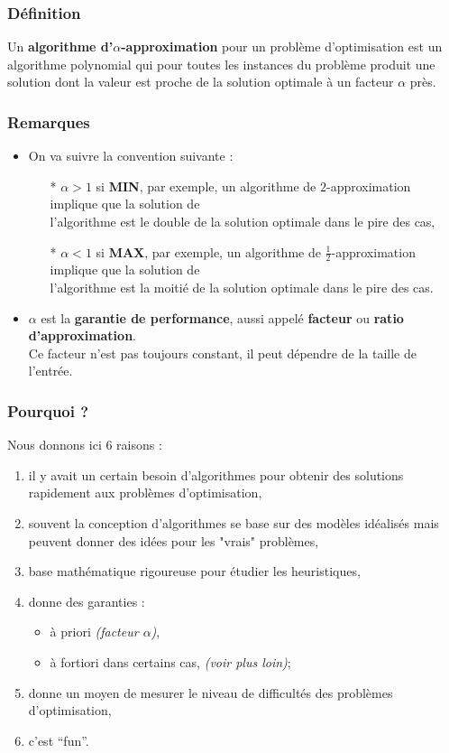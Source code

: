 \documentclass{article}
\begin{document}
\begin{sffamily}
\subsubsection*{Définition}
Un \textbf{algorithme d'$\alpha$-approximation} pour un problème d'optimisation est un algorithme polynomial qui \indent pour toutes les
instances du problème produit une solution dont la valeur est proche de la solution optimale \indent à un facteur $\alpha$ près.

\subsubsection*{Remarques}
\begin{itemize}
\item On va suivre la convention suivante :
\begin{itemize}
\item[*]$\boxed{\alpha > 1}$ si \textbf{MIN}, par exemple, un algorithme de $2$-approximation implique que la
	  solution de \\l'algorithme est le double de la solution optimale dans le pire des cas,
\item[*]$\boxed{\alpha < 1}$ si \textbf{MAX}, par exemple, un algorithme de $\frac{1}{2}$-approximation implique que la
	  solution de \\l'algorithme est la moitié de la solution optimale dans le pire des cas.
\end{itemize}
\item $\alpha$ est la \textbf{garantie de performance}, aussi appelé \textbf{facteur} ou \textbf{ratio d'approximation}.\\
	  Ce facteur n'est pas toujours constant, il peut dépendre de la taille de l'entrée.
\end{itemize}

\subsubsection*{Pourquoi ?}

Nous donnons ici 6 raisons :
\begin{enumerate}
\item il y avait un certain besoin d'algorithmes pour obtenir des solutions rapidement aux problèmes d'optimisation,
\item souvent la conception d'algorithmes se base sur des modèles idéalisés mais peuvent donner des idées pour les "vrais" problèmes,
\item base mathématique rigoureuse pour étudier les heuristiques,
\newpage
\item donne des garanties :
\begin{itemize}
\item à priori \textit{(facteur $\alpha$)},
\item à fortiori dans certains cas, \textit{(voir plus loin)};
\end{itemize}
\item donne un moyen de mesurer le niveau de difficultés des problèmes d'optimisation,
\item c'est ``fun''.
\end{enumerate}


\end{sffamily}
\end{document}
